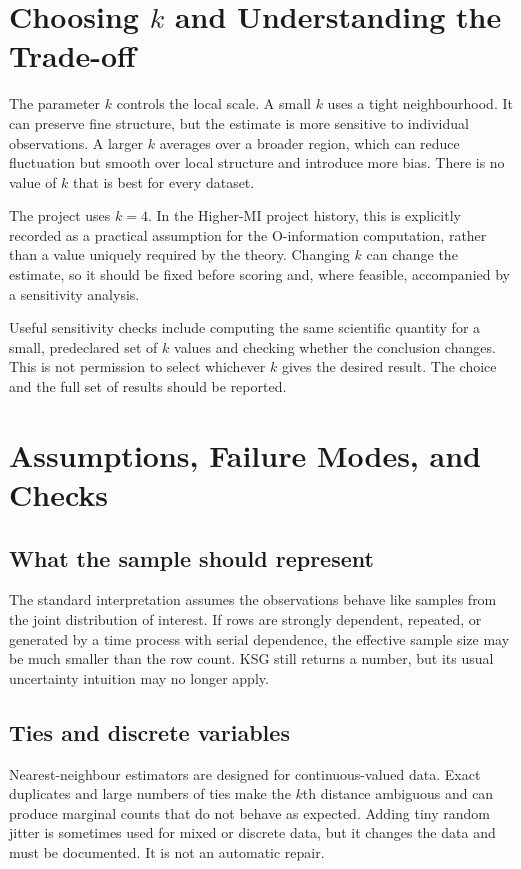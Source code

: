\documentclass[11pt,letterpaper,oneside]{report}
\begin{document}
\section{Choosing $k$ and Understanding the Trade-off}

The parameter $k$ controls the local scale. A small $k$ uses a tight neighbourhood. It can preserve fine structure, but the estimate is more sensitive to individual observations. A larger $k$ averages over a broader region, which can reduce fluctuation but smooth over local structure and introduce more bias. There is no value of $k$ that is best for every dataset.

The project uses $k=4$. In the Higher-MI project history, this is explicitly recorded as a practical assumption for the O-information computation, rather than a value uniquely required by the theory. Changing $k$ can change the estimate, so it should be fixed before scoring and, where feasible, accompanied by a sensitivity analysis.

Useful sensitivity checks include computing the same scientific quantity for a small, predeclared set of $k$ values and checking whether the conclusion changes. This is not permission to select whichever $k$ gives the desired result. The choice and the full set of results should be reported.

\section{Assumptions, Failure Modes, and Checks}

\subsection{What the sample should represent}

The standard interpretation assumes the observations behave like samples from the joint distribution of interest. If rows are strongly dependent, repeated, or generated by a time process with serial dependence, the effective sample size may be much smaller than the row count. KSG still returns a number, but its usual uncertainty intuition may no longer apply.

\subsection{Ties and discrete variables}

Nearest-neighbour estimators are designed for continuous-valued data. Exact duplicates and large numbers of ties make the $k$th distance ambiguous and can produce marginal counts that do not behave as expected. Adding tiny random jitter is sometimes used for mixed or discrete data, but it changes the data and must be documented. It is not an automatic repair.
\end{document}
